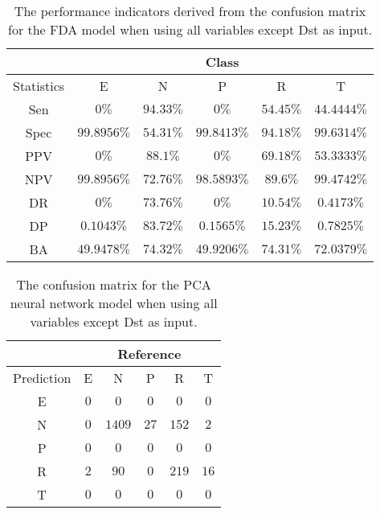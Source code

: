 \begin{table}[!ht]
	\centering
	\begin{tabular}{|c|c|c|c|c|c|}
		\hline
		 & \multicolumn{5}{c|}{Class} \\ \hline
		Statistics & E & N & P & R & T \\ \hline
		Sen & $0\%$ & $94.33\%$ & $0\%$ & $54.45\%$ & $44.4444\%$ \\ \hline
		Spec & $99.8956\%$ & $54.31\%$ & $99.8413\%$ & $94.18\%$ & $99.6314\%$ \\ \hline
		PPV & $0\%$ & $88.1\%$ & $0\%$ & $69.18\%$ & $53.3333\%$ \\ \hline
		NPV & $99.8956\%$ & $72.76\%$ & $98.5893\%$ & $89.6\%$ & $99.4742\%$ \\ \hline
		DR & $0\%$ & $73.76\%$ & $0\%$ & $10.54\%$ & $0.4173\%$ \\ \hline
		DP & $0.1043\%$ & $83.72\%$ & $0.1565\%$ & $15.23\%$ & $0.7825\%$ \\ \hline
		BA & $49.9478\%$ & $74.32\%$ & $49.9206\%$ & $74.31\%$ & $72.0379\%$ \\ \hline
	\end{tabular}
	\caption{The performance indicators derived from the confusion matrix for the FDA model when using all variables except Dst as input.}
	\label{tab:cs:reverse:noDst:fda}
\end{table}

\begin{table}[!ht]
	\centering
	\begin{tabular}{|c|c|c|c|c|c|}
		\hline
		 & \multicolumn{5}{|c|}{Reference} \\ \hline
		 Prediction & E & N & P & R & T \\ \hline
		 E & $0$ & $0$ & $0$ & $0$ & $0$ \\ \hline
		 N & $0$ & $1409$ & $27$ & $152$ & $2$ \\ \hline
		 P & $0$ & $0$ & $0$ & $0$ & $0$ \\ \hline
		 R & $2$ & $90$ & $0$ & $219$ & $16$ \\ \hline
		 T & $0$ & $0$ & $0$ & $0$ & $0$ \\ \hline
	\end{tabular}
	\caption{The confusion matrix for the PCA neural network model when using all variables except Dst as input.}
	\label{tab:cm:noDst:pcaNNet}
\end{table}

